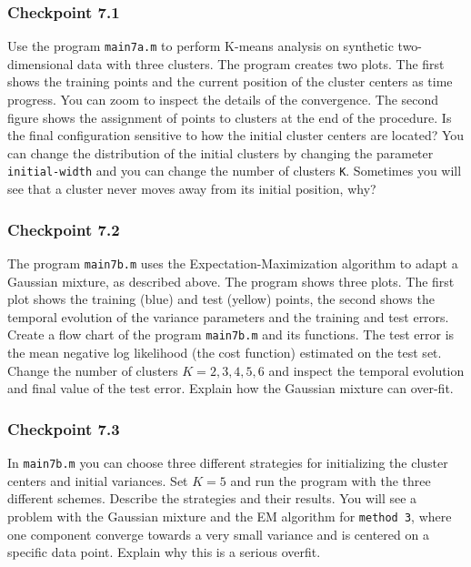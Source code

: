 \documentclass[times,12pt]{article}    %
\begin{document}
\subsubsection*{Checkpoint 7.1}

Use the program {\tt main7a.m} to perform K-means analysis on
synthetic two-dimensional data with three clusters. The program
creates two plots. The first shows the training points and the
current position of the cluster centers as time progress. You can
zoom to inspect the details of the convergence. The second figure
shows the assignment of points to clusters at the end of the
procedure. Is the final configuration sensitive to how the initial
cluster centers are located? You can change the distribution of
the initial clusters by changing the parameter {\tt initial-width}
and you can change the number of clusters {\tt K}. Sometimes you
will see that a cluster never moves away from its initial
position, why?


\subsubsection*{Checkpoint 7.2}

The program {\tt main7b.m} uses the Expectation-Maximization
algorithm to adapt a Gaussian mixture, as described above. The
program shows three plots. The first plot shows the training (blue)
and test (yellow) points, the second shows the temporal evolution
of the variance parameters and the training and test errors.
Create a flow chart of the program {\tt main7b.m} and its
functions. The test error is the mean negative log likelihood (the
cost function) estimated on the test set. Change the number of
clusters $K=2,3,4,5,6$ and inspect the temporal evolution and
final value of the test error. Explain how the Gaussian mixture
can over-fit.

\subsubsection*{Checkpoint 7.3}
In {\tt main7b.m} you can choose three different strategies for
initializing the cluster centers and initial variances.
 Set $K=5$ and run the program with the three different schemes. Describe the
strategies and their results. You will see a problem with the Gaussian mixture and
the EM algorithm for {\tt method 3}, where one component converge towards a very small variance
and is centered on a specific data point. Explain why this is a serious overfit.
\end{document}
